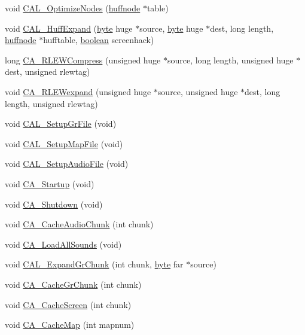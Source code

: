 \begin{DoxyCompactItemize}
void \hyperlink{ID__CA_8C_a18407f697ea7c33793eb8385adfa4e1d}{CAL\_\-OptimizeNodes} (\hyperlink{structhuffnode}{huffnode} $\ast$table)
\item 
void \hyperlink{ID__CA_8C_ad528d2babf088de313edb739e0c1dcf5}{CAL\_\-HuffExpand} (\hyperlink{ID__HEAD_8H_a0c8186d9b9b7880309c27230bbb5e69d}{byte} huge $\ast$source, \hyperlink{ID__HEAD_8H_a0c8186d9b9b7880309c27230bbb5e69d}{byte} huge $\ast$dest, long length, \hyperlink{structhuffnode}{huffnode} $\ast$hufftable, \hyperlink{ID__HEAD_8H_a7c6368b321bd9acd0149b030bb8275ed}{boolean} screenhack)
\item 
long \hyperlink{ID__CA_8C_a5ecb19a0976eb7cc7ebc0636ff16ef6f}{CA\_\-RLEWCompress} (unsigned huge $\ast$source, long length, unsigned huge $\ast$dest, unsigned rlewtag)
\item 
void \hyperlink{ID__CA_8C_a8147c0afc9dd7263e43e2499d58782b7}{CA\_\-RLEWexpand} (unsigned huge $\ast$source, unsigned huge $\ast$dest, long length, unsigned rlewtag)
\item 
void \hyperlink{ID__CA_8C_a01f3f70d7e61e8d3cb383031a7f3bb62}{CAL\_\-SetupGrFile} (void)
\item 
void \hyperlink{ID__CA_8C_a0a406782cb0615131e468e7dcfb70fe0}{CAL\_\-SetupMapFile} (void)
\item 
void \hyperlink{ID__CA_8C_ae145d2f5100f331f8f3a25518ceb4959}{CAL\_\-SetupAudioFile} (void)
\item 
void \hyperlink{ID__CA_8C_a4a88bf7bd8bef6188a34abe153f071e0}{CA\_\-Startup} (void)
\item 
void \hyperlink{ID__CA_8C_a322853b8f928f900e628b0b5d9dd20c7}{CA\_\-Shutdown} (void)
\item 
void \hyperlink{ID__CA_8C_a3a6c27701a37987c16cd4d4a885db478}{CA\_\-CacheAudioChunk} (int chunk)
\item 
void \hyperlink{ID__CA_8C_aa17596e9e057c980117d560cab6c876e}{CA\_\-LoadAllSounds} (void)
\item 
void \hyperlink{ID__CA_8C_a34eb9535940d7725a97dc903e19fb4c0}{CAL\_\-ExpandGrChunk} (int chunk, \hyperlink{ID__HEAD_8H_a0c8186d9b9b7880309c27230bbb5e69d}{byte} far $\ast$source)
\item 
void \hyperlink{ID__CA_8C_a33faa9e016da5c7e605f67f5c7ecf2a0}{CA\_\-CacheGrChunk} (int chunk)
\item 
void \hyperlink{ID__CA_8C_a61ed1e53a23fd4c6ef784e6ec7ae73d2}{CA\_\-CacheScreen} (int chunk)
\item 
void \hyperlink{ID__CA_8C_a47feb1d5d4fc9fdd76732533b42a2a73}{CA\_\-CacheMap} (int mapnum)
\item 

\end{DoxyCompactItemize}
